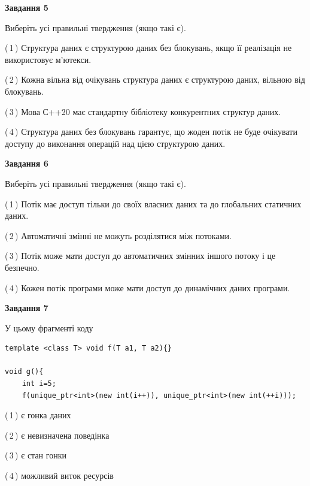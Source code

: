 \documentclass[12pt, ukrainian]{article}
\begin{document}
\begin {large}
{\begin{center}
\textbf{Завдання 5}
\end{center}

Виберіть усі правильні твердження (якщо такі є).\par
\vspace{2mm}

(\,1\,) Структура даних є структурою даних без блокувань, якщо її реалізація не використовує м’ютекси.%

(\,2\,) Кожна вільна від очікувань структура даних є структурою даних, вільною від блокувань.%

(\,3\,) Мова С++20 має стандартну бібліотеку конкурентних структур даних.%

(\,4\,) Структура даних без блокувань гарантує, що жоден потік не буде очікувати доступу до виконання операцій над цією структурою даних.%
\newpage


\begin{center}
\textbf{Завдання 6}
\end{center}

Виберіть усі правильні твердження (якщо такі є).\par
\vspace{2mm}

(\,1\,) Потік має доступ тільки до своїх власних даних та до глобальних статичних даних.%

(\,2\,) Автоматичні змінні не можуть розділятися між потоками.%

(\,3\,) Потік може мати доступ до автоматичних змінних іншого потоку і це безпечно.%

(\,4\,) Кожен потік програми може мати доступ до динамічних даних програми.%


\begin{center}
\textbf{Завдання 7}
\end{center}

У цьому фрагменті коду
\begin{verbatim}
template <class T> void f(T a1, T a2){}

void g(){
    int i=5;
    f(unique_ptr<int>(new int(i++)), unique_ptr<int>(new int(++i)));
\end{verbatim}

(\,1\,) є гонка даних%

(\,2\,) є невизначена поведінка%

(\,3\,) є стан гонки%

(\,4\,) можливий виток ресурсів%

}
\end {large}

\vspace{4mm}
\newpage
\end{document}
